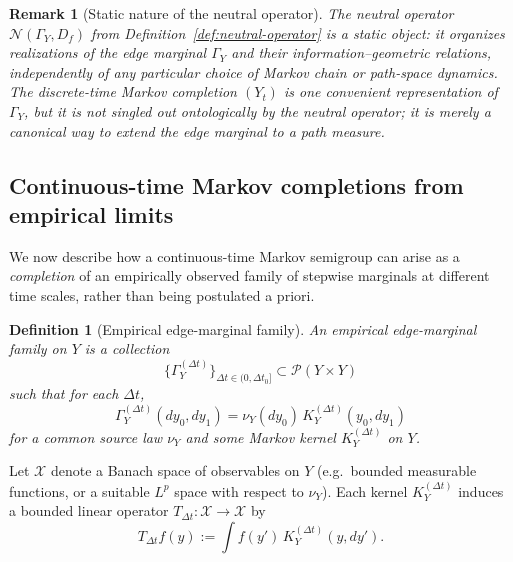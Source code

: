 \documentclass[11pt]{article}
\newtheorem{definition}{Definition}
\newtheorem{remark}{Remark}
\newcommand{\Pcal}{\mathcal{P}}
\newcommand{\Ncal}{\mathcal{N}}
\newcommand{\Xcal}{\mathcal{X}}
\begin{document}
\begin{remark}[Static nature of the neutral operator]
\label{rmk:neutral-static}
The neutral operator $\Ncal(\Gamma_Y,D_f)$ from
Definition~\ref{def:neutral-operator} is a \emph{static} object: it
organizes realizations of the edge marginal $\Gamma_Y$ and their
information--geometric relations, independently of any particular choice
of Markov chain or path-space dynamics. The discrete-time Markov
completion $(Y_t)$ is one convenient representation of $\Gamma_Y$, but
it is not singled out ontologically by the neutral operator; it is
merely a canonical way to extend the edge marginal to a path measure.
\end{remark}

\subsection{Continuous-time Markov completions from empirical limits}
\label{subsec:markov-completion-continuous}

We now describe how a continuous-time Markov semigroup can arise as a
\emph{completion} of an empirically observed family of stepwise
marginals at different time scales, rather than being postulated
a priori.

\begin{definition}[Empirical edge-marginal family]
\label{def:empirical-edge-family}
An \emph{empirical edge-marginal family} on $Y$ is a collection
\[
  \bigl\{\Gamma_Y^{(\Delta t)}\bigr\}_{\Delta t\in(0,\Delta t_0]}
  \subset \Pcal(Y\times Y)
\]
such that for each $\Delta t$,
\[
  \Gamma_Y^{(\Delta t)}(dy_0,dy_1)
  = \nu_Y(dy_0)\,K_Y^{(\Delta t)}(y_0,dy_1)
\]
for a common source law $\nu_Y$ and some Markov kernel
$K_Y^{(\Delta t)}$ on $Y$.
\end{definition}

Let $\Xcal$ denote a Banach space of observables on $Y$ (e.g.\ bounded
measurable functions, or a suitable $L^p$ space with respect to
$\nu_Y$). Each kernel $K_Y^{(\Delta t)}$ induces a bounded linear
operator $T_{\Delta t}:\Xcal\to\Xcal$ by
\[
  T_{\Delta t}f(y)
  := \int f(y')\,K_Y^{(\Delta t)}(y,dy').
\]
\end{document}
